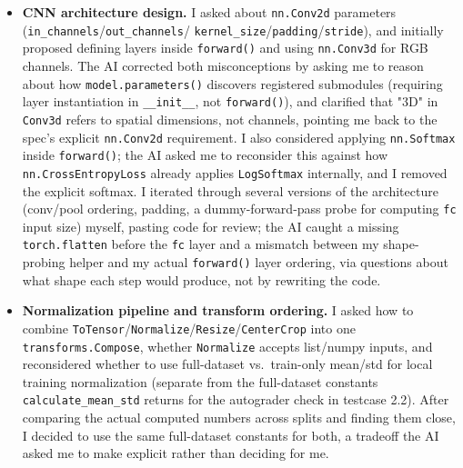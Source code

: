 \begin{itemize}[leftmargin=*]
\item \textbf{CNN architecture design.}
I asked about \texttt{nn.Conv2d} parameters (\texttt{in\_channels}/\texttt{out\_channels}/
\texttt{kernel\_size}/\texttt{padding}/\texttt{stride}), and initially proposed defining
layers inside \texttt{forward()} and using \texttt{nn.Conv3d} for RGB channels. The AI
corrected both misconceptions by asking me to reason about how \texttt{model.parameters()}
discovers registered submodules (requiring layer instantiation in \texttt{\_\_init\_\_},
not \texttt{forward()}), and clarified that "3D" in \texttt{Conv3d} refers to spatial
dimensions, not channels, pointing me back to the spec's explicit \texttt{nn.Conv2d}
requirement. I also considered applying \texttt{nn.Softmax} inside \texttt{forward()}; the
AI asked me to reconsider this against how \texttt{nn.CrossEntropyLoss} already applies
\texttt{LogSoftmax} internally, and I removed the explicit softmax. I iterated through
several versions of the architecture (conv/pool ordering, padding, a dummy-forward-pass
probe for computing \texttt{fc} input size) myself, pasting code for review; the AI caught
a missing \texttt{torch.flatten} before the \texttt{fc} layer and a mismatch between my
shape-probing helper and my actual \texttt{forward()} layer ordering, via questions about
what shape each step would produce, not by rewriting the code.

\item \textbf{Normalization pipeline and transform ordering.}
I asked how to combine \texttt{ToTensor}/\texttt{Normalize}/\texttt{Resize}/\texttt{CenterCrop}
into one \texttt{transforms.Compose}, whether \texttt{Normalize} accepts list/numpy inputs,
and reconsidered whether to use full-dataset vs.\ train-only mean/std for local training
normalization (separate from the full-dataset constants \texttt{calculate\_mean\_std} returns
for the autograder check in testcase 2.2). After comparing the actual computed numbers across
splits and finding them close, I decided to use the same full-dataset constants for both,
a tradeoff the AI asked me to make explicit rather than deciding for me.


\end{itemize}
